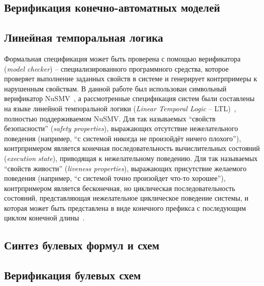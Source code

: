 \subsection{Верификация конечно-автоматных моделей}
\label{sub:automata-verification}

\subsection{Линейная темпоральная логика}%
\label{sub:ltl}


Формальная спецификация может быть проверена с помощью верификатора (\emph{model checker}) \--- специализированного программного средства, которое проверяет выполнение заданных свойств в системе и генерирует контрпримеры к нарушенным свойствам.
В данной работе был использован символьный верификатор NuSMV~\cite{NuSMV}, а рассмотренные спецификация систем были составлены на языке линейной темпоральной логики (\textit{Linear Temporal Logic} \--- LTL)~\cite{ltl}, полностью поддерживаемом NuSMV\@.
Для так называемых \enquote{свойств безопасности} (\textit{safety properties}), выражающих отсутствие нежелательного поведения (например, \enquote{с системой никогда не произойдёт ничего плохого}), контрпримером является конечная последовательность вычислительных состояний (\textit{execution state}), приводящая к нежелательному поведению.
Для так называемых \enquote{свойств живости} (\textit{liveness properties}), выражающих присутствие желаемого поведения (например, \enquote{с системой точно произойдет что-то хорошее}), контрпримером является бесконечная, но циклическая последовательность состояний, представляющая нежелательное циклическое поведение системы, и которая может быть представлена в виде конечного префикса с последующим циклом конечной длины~\cite{clarke1999model}.



\subsection{Синтез булевых формул и схем}
\label{sub:circuits-synthesis}

\subsection{Верификация булевых схем}
\label{sub:circuits-verification}

